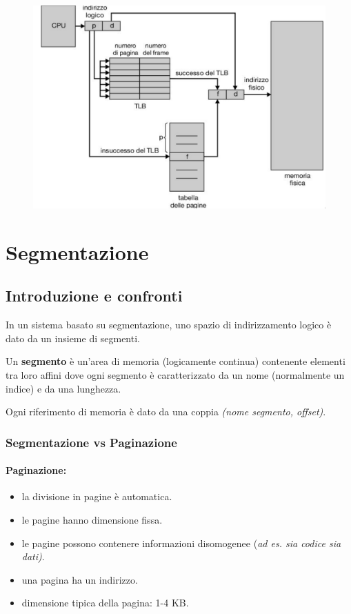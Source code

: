 \begin{figure} [h]
    \centering
    \includegraphics[width=0.7\linewidth]{Images/Screenshot 2025-01-17 at 16-06-35 so-05-memoria - so-05-memoria.pdf.png}
\end{figure}

\newpage
\section{Segmentazione}
\subsection{Introduzione e confronti}
In un sistema basato su segmentazione, uno spazio di indirizzamento logico è dato da un insieme di segmenti.

Un \textbf{segmento} è un'area di memoria (logicamente continua)
contenente elementi tra loro affini dove ogni segmento è caratterizzato da un nome (normalmente un indice)
e da una lunghezza.

Ogni riferimento di memoria è dato da una coppia \textit{(nome segmento, offset)}.

\subsubsection{Segmentazione vs Paginazione}
\paragraph{Paginazione:}
\begin{itemize}
    \item la divisione in pagine è automatica.
    \item  le pagine hanno dimensione fissa.
    \item le pagine possono contenere informazioni disomogenee (\textit{ad es. sia codice sia dati)}.
    \item una pagina ha un indirizzo.
    \item dimensione tipica della pagina: 1-4 KB.
\end{itemize}

